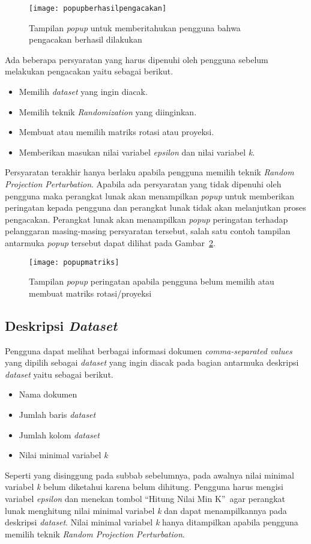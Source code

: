 \begin{figure}
	\centering
	\texttt{[image: popupberhasilpengacakan]}
	\caption{Tampilan \textit{popup} untuk memberitahukan pengguna bahwa pengacakan berhasil dilakukan}
	\label{fig:popupberhasilpengacakan}
\end{figure}

Ada beberapa persyaratan yang harus dipenuhi oleh pengguna sebelum melakukan pengacakan yaitu sebagai berikut.
\begin{itemize}
	\item Memilih \textit{dataset} yang ingin diacak.
	\item Memilih teknik \textit{Randomization} yang diinginkan.
	\item Membuat atau memilih matriks rotasi atau proyeksi.
	\item Memberikan masukan nilai variabel \textit{epsilon} dan nilai variabel \textit{k}.
\end{itemize}
Persyaratan terakhir hanya berlaku apabila pengguna memilih teknik \textit{Random Projection Perturbation}. Apabila ada persyaratan yang tidak dipenuhi oleh pengguna maka perangkat lunak akan menampilkan \textit{popup} untuk memberikan peringatan kepada pengguna dan perangkat lunak tidak akan melanjutkan proses pengacakan. Perangkat lunak akan menampilkan \textit{popup} peringatan terhadap pelanggaran masing-masing persyaratan tersebut, salah satu contoh tampilan antarmuka \textit{popup} tersebut dapat dilihat pada Gambar~\ref{fig:popupmatriks}.

\begin{figure}
	\centering
	\texttt{[image: popupmatriks]}
	\caption{Tampilan \textit{popup} peringatan apabila pengguna belum memilih atau membuat matriks rotasi/proyeksi}
	\label{fig:popupmatriks}
\end{figure}

\subsection{Deskripsi \textit{Dataset}}
\label{subsec:deskripsidataset}

Pengguna dapat melihat berbagai informasi dokumen \textit{comma-separated values} yang dipilih sebagai \textit{dataset} yang ingin diacak pada bagian antarmuka deskripsi \textit{dataset} yaitu sebagai berikut. 
\begin{itemize}
	\item Nama dokumen
	\item Jumlah baris \textit{dataset}
	\item Jumlah kolom \textit{dataset}
	\item Nilai minimal variabel \textit{k}
\end{itemize}
Seperti yang disinggung pada subbab sebelumnya, pada awalnya nilai minimal variabel \textit{k} belum diketahui karena belum dihitung. Pengguna harus mengisi variabel \textit{epsilon} dan menekan tombol \textquotedblleft Hitung Nilai Min K\textquotedblright~agar perangkat lunak menghitung nilai minimal variabel \textit{k} dan dapat menampilkannya pada deskripsi \textit{dataset}. Nilai minimal variabel \textit{k} hanya ditampilkan apabila pengguna memilih teknik \textit{Random Projection Perturbation}.

